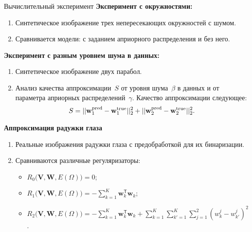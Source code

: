 \documentclass[10pt,pdf,hyperref={unicode}]{beamer}
\begin{document}
\begin{frame}{Вычислительный эксперимент}
\justifying
\textbf{Эксперимент с окружностями:}
\begin{enumerate}
\item Синтетическое изображение трех непересекающих окружностей с шумом.
\item Сравнивается модели: с заданием априорного распределения и без него.
\end{enumerate}

\textbf{Эксперимент с разным уровнем шума в данных:}

\begin{enumerate}
\item Синтетическое изображение двух парабол.
\item Анализ качества аппроксимации~$S$ от уровня шума~$\beta$ в данных и от параметра априорных распределений~$\gamma$. Качество аппроксимации следующее:
\[
\setlength\abovedisplayskip{0pt}
S = ||\mathbf{w}^\text{pred}_{1} - \mathbf{w}^\text{true}_{1}||^{2}_{2} + ||\mathbf{w}^\text{pred}_{2} - \mathbf{w}^\text{true}_{2}||^{2}_{2}.
\setlength\belowdisplayskip{0pt}
\]
\end{enumerate}

\textbf{Аппроксимация радужки глаза}
\begin{enumerate}
	\item Реальные изображения радужки глаза с предобработкой для их бинаризации. 
	\item Сравниваются различные регуляризаторы:
	\begin{itemize}
		\item $R_0\bigl(\mathbf{V}, \mathbf{W}, E(\Omega)\bigr)=0$;
		\item $R_1\bigl(\mathbf{V}, \mathbf{W}, E(\Omega)\bigr)= -\sum_{k=1}^{K}\mathbf{w}_k^{\mathsf{T}}\mathbf{w}_k$;
		\item $R_2\bigl(\mathbf{V}, \mathbf{W}, E(\Omega)\bigr)= -\sum_{k=1}^{K}\mathbf{w}_k^{\mathsf{T}}\mathbf{w}_k + \sum_{k=1}^{K}\sum_{k'=1}^{K}\sum_{j=1}^2\left(w_k^j-w_{k'}^j\right)^2$.
	\end{itemize}
\end{enumerate}


\end{frame}
\end{document}
